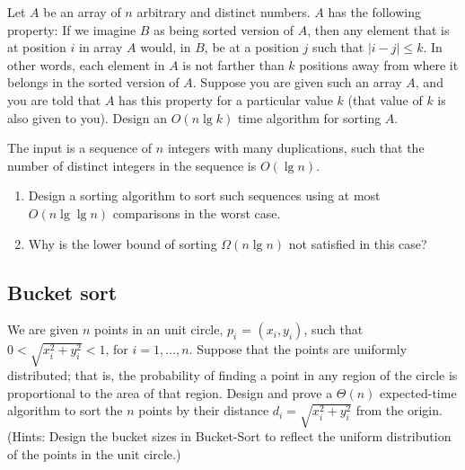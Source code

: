\begin{Exercise}
Let $A$ be an array of $n$ arbitrary and distinct numbers. $A$ has the following property: If we imagine $B$ as being sorted version of $A$, then any element that is at position $i$ in array $A$ would, in $B$, be at a position $j$ such that $| i - j | \leq k$. In other words, each element in $A$ is not farther than $k$ positions away from where it belongs in the sorted version of $A$. Suppose you are given such an array $A$, and you are told that $A$ has this property for a particular value $k$ (that value of $k$ is also given to you). Design an $O(n \lg k)$ time algorithm for sorting $A$. 
\end{Exercise}
\begin{Answer}
\end{Answer}

\begin{Exercise}
The input is a sequence of $n$ integers with many duplications, such that the number of distinct integers in the sequence is $O(\lg n)$.
\begin{enumerate}
\item Design a sorting algorithm to sort such sequences using at most $O(n \lg \lg n)$ comparisons in the worst case.
\item Why is the lower bound of sorting $\Omega(n \lg n)$ not satisfied in this case? 
\end{enumerate}
\end{Exercise}
\begin{Answer}
\end{Answer}

\subsection{Bucket sort}
\begin{Exercise}
We are given $n$ points in an unit circle, $ p_i$ = $(x_i, y_i)$, such that $0 < \sqrt{x_i^2 + y_i^2} < 1$, for $i = 1, \dots, n$. Suppose that the points are uniformly distributed; that is, the probability of finding a point in any region of the circle is proportional to the area of that region. Design and prove a $\Theta(n)$ expected-time algorithm to sort the $n$ points by their distance $d_i = \sqrt{x_i^2 + y_i^2}$ from the origin. (Hints: Design the bucket sizes in Bucket-Sort to reflect the uniform distribution of the points in the unit circle.) 
\end{Exercise}
\begin{Answer}
\end{Answer}

